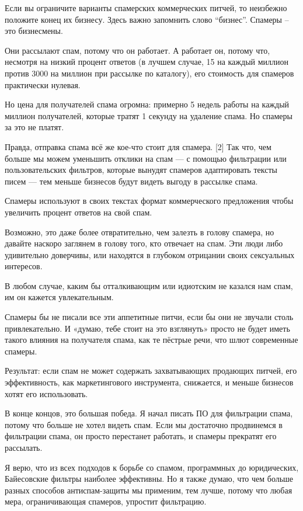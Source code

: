 \documentclass[ebook,12pt,oneside,openany]{memoir}
\begin{document}
Если вы ограничите варианты спамерских коммерческих питчей, то
неизбежно положите конец их бизнесу. Здесь важно запомнить слово
“бизнес”. Спамеры – это бизнесмены.

Они рассылают спам, потому что он работает. А работает он, потому что,
несмотря на низкий процент ответов (в лучшем случае, 15 на каждый
миллион против 3000 на миллион при рассылке по каталогу), его
стоимость для спамеров практически нулевая.

Но цена для получателей спама огромна: примерно 5 недель работы на
каждый миллион получателей, которые тратят 1 секунду на удаление
спама. Но спамеры за это не платят.

Правда, отправка спама всё же кое-что стоит для спамера. [2] Так что,
чем больше мы можем уменьшить отклики на спам — с помощью фильтрации
или пользовательских фильтров, которые вынудят спамеров адаптировать
тексты писем — тем меньше бизнесов будут видеть выгоду в рассылке
спама.

Спамеры используют в своих текстах формат коммерческого предложения
чтобы увеличить процент ответов на свой спам.

Возможно, это даже более отвратительно, чем залезть в голову спамера,
но давайте наскоро заглянем в голову того, кто отвечает на спам. Эти
люди либо удивительно доверчивы, или находятся в глубоком отрицании
своих сексуальных интересов.

В любом случае, каким бы отталкивающим или идиотским не казался нам
спам, им он кажется увлекательным.

Спамеры бы не писали все эти аппетитные питчи, если бы они не звучали
столь привлекательно. И «думаю, тебе стоит на это взглянуть» просто не
будет иметь такого влияния на получателя спама, как те пёстрые речи,
что шлют современные спамеры.

Результат: если спам не может содержать захватывающих продающих
питчей, его эффективность, как маркетингового инструмента, снижается,
и меньше бизнесов хотят его использовать.

В конце концов, это большая победа. Я начал писать ПО для фильтрации
спама, потому что больше не хотел видеть спам. Если мы достаточно
продвинемся в фильтрации спама, он просто перестанет работать, и
спамеры прекратят его рассылать.

Я верю, что из всех подходов к борьбе со спамом, программных до
юридических, Байесовские фильтры наиболее эффективны. Но я также
думаю, что чем больше разных способов антиспам-защиты мы применим, тем
лучше, потому что любая мера, ограничивающая спамеров, упростит
фильтрацию.
\end{document}
